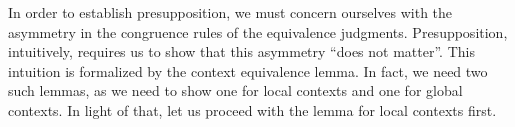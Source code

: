 In order to establish presupposition, we must concern ourselves with the asymmetry in
the congruence rules of the equivalence judgments. %
Presupposition, intuitively, requires us to show that this asymmetry ``does not
matter''. %
This intuition is formalized by the context equivalence lemma. %
In fact, we need two such lemmas, as we need to show one for local contexts and one
for global contexts. %
In light of that, let us proceed with the lemma for local contexts first.

